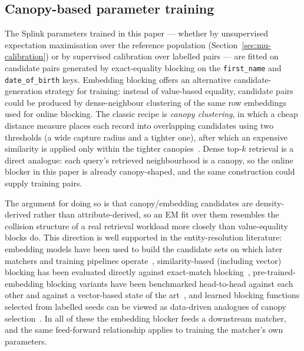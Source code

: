 \documentclass[11pt]{article}
\begin{document}
\subsection{Canopy-based parameter training}
The Splink parameters trained in this paper --- whether by unsupervised expectation maximisation over the reference population (Section~\ref{sec:mu-calibration}) or by supervised calibration over labelled pairs --- are fitted on candidate pairs generated by exact-equality blocking on the \texttt{first\_name} and \texttt{date\_of\_birth} keys. Embedding blocking offers an alternative candidate-generation strategy for training: instead of value-based equality, candidate pairs could be produced by dense-neighbour clustering of the same row embeddings used for online blocking. The classic recipe is \emph{canopy clustering}, in which a cheap distance measure places each record into overlapping candidates using two thresholds (a wide capture radius and a tighter one), after which an expensive similarity is applied only within the tighter canopies~\cite{mccallum2000}. Dense top-$k$ retrieval is a direct analogue: each query's retrieved neighbourhood is a canopy, so the online blocker in this paper is already canopy-shaped, and the same construction could supply training pairs.

The argument for doing so is that canopy/embedding candidates are density-derived rather than attribute-derived, so an EM fit over them resembles the collision structure of a real retrieval workload more closely than value-equality blocks do. This direction is well supported in the entity-resolution literature: embedding models have been used to build the candidate sets on which later matchers and training pipelines operate~\cite{ebreheem2018}, similarity-based (including vector) blocking has been evaluated directly against exact-match blocking~\cite{thirumuruganathan2021}, pre-trained-embedding blocking variants have been benchmarked head-to-head against each other and against a vector-based state of the art~\cite{zeakis2023}, and learned blocking functions selected from labelled seeds can be viewed as data-driven analogues of canopy selection~\cite{zhang2020autoblock}. In all of these the embedding blocker feeds a downstream matcher, and the same feed-forward relationship applies to training the matcher's own parameters.
\end{document}

